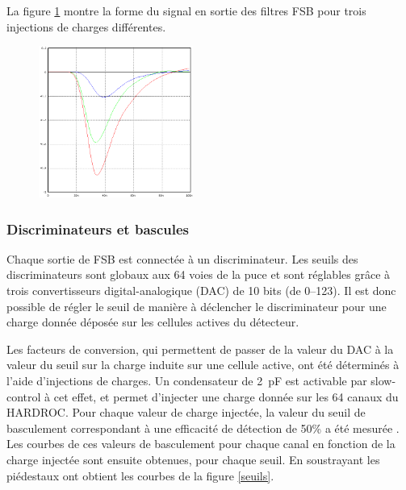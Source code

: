 La figure \ref{signal} montre la forme du signal en sortie des filtres FSB pour trois injections de charges différentes.
\begin{figure}[ht!]
	\centering
	\includegraphics[width=0.45\textwidth]{GLA/SIGNAL.png}
	\label{signal}
\end{figure}

\vspace*{-1.5cm}

\subsubsection{Discriminateurs et bascules}
Chaque sortie de FSB est connectée à un discriminateur. Les seuils des discriminateurs sont globaux aux \num{64} voies de la puce et sont réglables grâce à trois convertisseurs digital-analogique (DAC) de \num{10} bits (de \SIrange{0}{123}{}). Il est donc possible de régler le seuil de manière à déclencher le discriminateur pour une charge donnée déposée sur les cellules actives du détecteur.

Les facteurs de conversion, qui permettent de passer de la valeur du DAC à la valeur du seuil sur la charge induite sur une cellule active, ont été déterminés à l'aide d'injections de charges. Un condensateur de \SI{2}{\pico\farad} est activable par slow-control à cet effet, et permet d'injecter une charge donnée sur les \num{64} canaux du HARDROC. Pour chaque valeur de charge injectée, la valeur du seuil de basculement correspondant à une efficacité de détection de 50\% a été mesurée \cite{kieffer:tel-00751999}. Les courbes de ces valeurs de basculement pour chaque canal en fonction de la charge injectée sont ensuite obtenues, pour chaque seuil. En soustrayant les piédestaux ont obtient les courbes de la figure \ref{seuils}.

